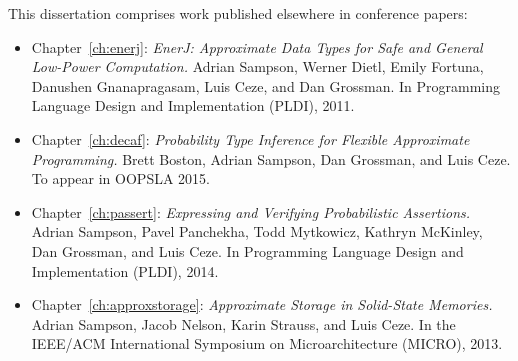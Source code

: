 This dissertation comprises work published elsewhere in conference papers:

\begin{itemize}
\item Chapter~\ref{ch:enerj}:
\textit{EnerJ: Approximate Data Types for Safe and General Low-Power
Computation.}
Adrian Sampson, Werner Dietl, Emily Fortuna, Danushen Gnanapragasam, Luis Ceze, and Dan Grossman.
In Programming Language Design and Implementation (PLDI), 2011.

\item Chapter~\ref{ch:decaf}:
\textit{Probability Type Inference for Flexible Approximate Programming.}
Brett Boston, Adrian Sampson, Dan Grossman, and Luis Ceze.
To appear in OOPSLA 2015.

\item Chapter~\ref{ch:passert}:
\textit{Expressing and Verifying Probabilistic Assertions.}
Adrian Sampson, Pavel Panchekha, Todd Mytkowicz, Kathryn McKinley, Dan Grossman, and Luis Ceze.
In Programming Language Design and Implementation (PLDI), 2014.

\item Chapter~\ref{ch:approxstorage}:
\textit{Approximate Storage in Solid-State Memories.}
Adrian Sampson, Jacob Nelson, Karin Strauss, and Luis Ceze.
In the IEEE/ACM International Symposium on Microarchitecture (MICRO), 2013.
\end{itemize}

